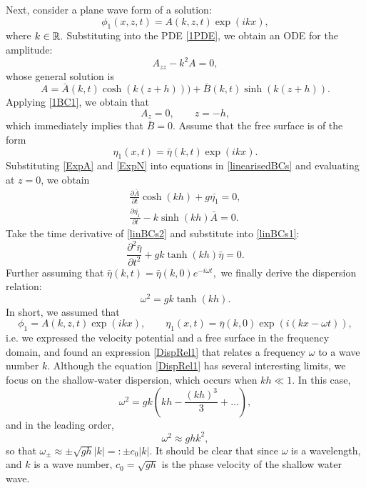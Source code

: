 \documentclass[10pt,reqno,oneside,a4paper]{article}
\begin{document}
Next, consider a plane wave form of a solution: 
\begin{equation}\label{ExpA}
 \phi_1(x,z,t) = A(k,z,t)\exp(ikx),
\end{equation}
where $k \in \mathbb R.$ Substituting into the PDE \eqref{1PDE}, we obtain an ODE for the amplitude:
\[ A_{zz} - k^2 A = 0, \]
whose general solution is
\[ A = \bar{A}(k,t)\cosh(k(z+h))) + \bar{B}(k,t)\sinh(k(z+h)). \]
Applying \eqref{1BC1}, we obtain that 
\[ 
A_z= 0, \qquad z = -h,
\]
which immediately implies that $\bar{B}=0.$
Assume that the free surface is of the form
\begin{equation}\label{ExpN}
\eta_1(x,t) = \bar{\eta}(k,t) \exp(ikx).
\end{equation}
Substituting \eqref{ExpA} and \eqref{ExpN} into equations in \eqref{linearisedBCs} and evaluating at $z=0$, we obtain 
\begin{align}
\frac{\partial \bar{A}}{\partial t} \cosh(kh) + g\bar{\eta_1} = 0, \label{linBCs1}\\ 
\frac{\partial \bar{\eta_1}}{\partial t} - k \sinh(kh)\bar{A}  = 0.  \label{linBCs2}
\end{align}
Take the time derivative of \eqref{linBCs2} and substitute into \eqref{linBCs1}:
\[ 
\frac{\partial^2 \bar{\eta}}{\partial t^2} +g k \tanh(kh)\bar{\eta} = 0.
\]
Further assuming that $\bar{\eta}(k,t) = \bar{\eta}(k,0)e^{-i \omega t},$ we finally derive the dispersion relation:
\begin{equation}\label{DispRel1}
\omega^2 = gk \tanh(kh).
\end{equation}
In short, we assumed that 
\[ 
\phi_1 = A(k,z,t)\exp(ikx), \qquad \eta_1(x,t) = \bar{\eta}(k,0)\exp(i(kx-\omega t)),
\]
i.e. we expressed the velocity potential and a free surface in the frequency domain, and found an expression \eqref{DispRel1} that relates a frequency $\omega$ to a wave number $k.$
Although the equation \eqref{DispRel1} has several interesting limits, we focus on the shallow-water dispersion, which occurs when $kh \ll 1.$ In this case, 
\begin{equation}\label{DispRel2}
\omega^2 = gk (kh - \frac{(kh)^3}{3} + \ldots),
\end{equation}
and in the leading order, 
\begin{equation}\label{DispRel3}
\omega^2  \approx ghk^2,
\end{equation}
so that $\omega_{\pm} \approx \pm\sqrt{gh} |k| =: \pm c_0 |k|.$ It should be clear that since $\omega$ is a wavelength, and $k$ is a wave number, $c_0 = \sqrt{gh}$ is the phase velocity of the shallow water wave. 
\end{document}
